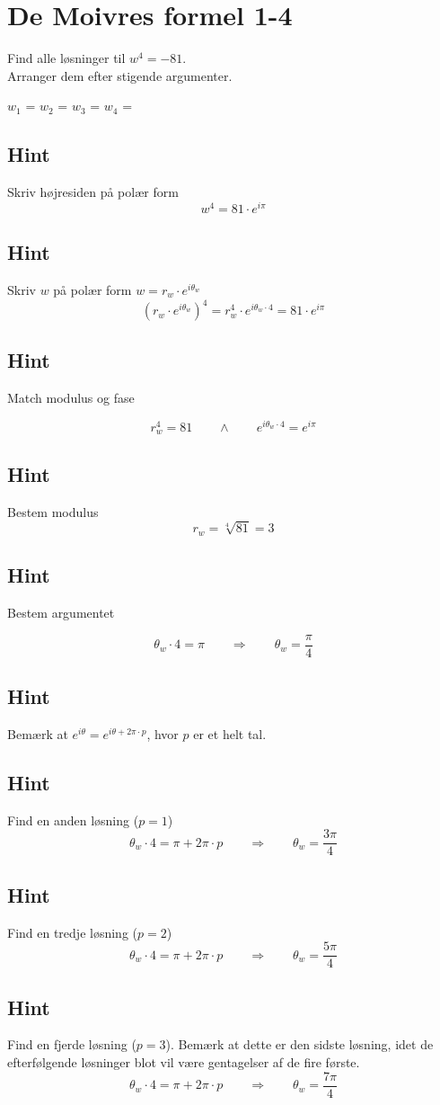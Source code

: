 \documentclass{article}
\newenvironment{exercise}[1]{\newpage\section{#1}}{}
\newcommand{\answerbox}[1]{\fbox{$#1$}}
\newcommand{\hint}{\subsection*{Hint}}
\begin{document}
\begin{exercise}{De Moivres formel 1-4}
	
	Find alle løsninger til $w^4=-81$. \\
	Arranger dem efter stigende argumenter.
	
	$w_1$ = \answerbox{3 \cdot e^{i \frac{\pi}{4}}}		$w_2$ = \answerbox{3 \cdot e^{i \frac{3 \pi}{4}}}		$w_3$ = \answerbox{3 \cdot e^{i \frac{5 \pi}{4}}}		$w_4$ = \answerbox{3 \cdot e^{i \frac{7 \pi}{4}}}	 
	
	
	\hint 
	
	Skriv højresiden på polær form
	\[
	w^4 = 81 \cdot e^{i \pi}
	\]
	
	
	\hint
	
	Skriv $w$ på polær form $w = r_w \cdot e^{i \theta_w}$
	\[
	\left(r_w \cdot e^{i \theta_w}\right)^4 = r_w^4 \cdot e^{i \theta_w \cdot 4} = 81 \cdot e^{i \pi}
	\]
	
	\hint 
	Match modulus og fase
	
	\[
	r_w^4 = 81 \qquad \wedge \qquad e^{i \theta_w \cdot 4} = e^{i \pi}
	\]
	
	\hint
	
	Bestem modulus
	\[
	r_w  =  \sqrt[4]{81} = 3
	\]
	
	\hint
	
	Bestem argumentet
	
	\[
	\theta_w \cdot 4 = \pi \qquad \Rightarrow \qquad  \theta_w = \frac{\pi}{4}
	\]
	
	\hint
	
	Bemærk at $e^{i \theta} = e^{i \theta + 2 \pi \cdot p}$, hvor $p$ er et helt tal.
	
	\hint
	
	Find en anden løsning ($p=1$)
	\[
	\theta_w \cdot 4 = \pi  + 2 \pi \cdot p \qquad \Rightarrow \qquad  \theta_w = \frac{3 \pi}{4}
	\]
	
	\hint
	
	Find en tredje løsning ($p=2$)
	\[
	\theta_w \cdot 4 = \pi  + 2 \pi \cdot p \qquad \Rightarrow  \qquad  \theta_w = \frac{5 \pi}{4}
	\]
	
	\hint
	
	Find en fjerde løsning ($p=3$). Bemærk at dette er den sidste løsning, idet de efterfølgende løsninger blot vil være gentagelser af de fire første. 
	\[
	\theta_w \cdot 4 = \pi  + 2 \pi \cdot p \qquad \Rightarrow  \qquad  \theta_w = \frac{7 \pi}{4}
	\]
	
\end{exercise}

\newpage
\end{document}
